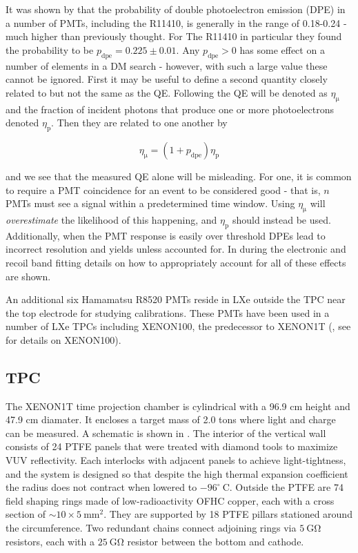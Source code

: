 It was shown by  that the probability of double photoelectron emission (DPE) in a number of PMTs, including the
R11410, is generally in the range of 0.18-0.24 - much higher than previously thought.  For The R11410 in particular they found the
probability to be $p_{\mathrm{dpe}} = 0.225 \pm 0.01$.  Any $p_{\mathrm{dpe}} > 0$ has some effect on a number of elements in a DM
search - however, with such a large value these cannot be ignored.  First it may be useful to define a second quantity closely
related to but not the same as the QE.  Following  the QE will be denoted as $\eta_{\mathrm{\mu}}$ and the fraction of
incident photons that produce one or more photoelectrons denoted $\eta_{\mathrm{p}}$.  Then they are related to one another by

\begin{equation}
\eta_{\mathrm{\mu}} = (1 + p_{\mathrm{dpe}}) \eta_{\mathrm{p}}
\label{eq:xenon1t_pmts_dpe}
\end{equation}

\noindent and we see that the measured QE alone will be misleading.  For one, it is common to require a PMT coincidence for an event to
be considered good - that is, $n$ PMTs must see a signal within a predetermined time window.  Using $\eta_{\mathrm{\mu}}$ will
\textit{overestimate} the likelihood of this happening, and $\eta_{\mathrm{p}}$ should instead be used.  Additionally, when the PMT
response is easily over threshold DPEs lead to incorrect resolution and yields unless accounted for.  In
 during the electronic and recoil band fitting details on how to
appropriately account for all of these effects are shown.

An additional six Hamamatsu R8520 PMTs reside in LXe outside the TPC near the top electrode for studying calibrations.  These PMTs have
been used in a number of LXe TPCs including XENON100, the predecessor to XENON1T (, see  for
details on XENON100).




\subsection{TPC}
\label{subsec:xenon1t_tpc}
The XENON1T time projection chamber is cylindrical with a 96.9 cm height and 47.9 cm diamater.  It encloses a target mass of 2.0 tons where
light and charge can be measured.  A schematic is shown in .  The interior of the vertical wall consists of 24
PTFE panels that were treated with diamond tools to
maximize VUV reflectivity.  Each interlocks with adjacent panels to achieve light-tightness, and the system is designed so that despite
the high thermal expansion coefficient the radius does not contract when lowered to $-96^{\circ}\ \mathrm{C}$.  Outside the PTFE are 74
field shaping rings made of low-radioactivity OFHC copper, each with a cross section of ${\sim} 10 \times 5\ \mathrm{mm^{2}}$.  They are
supported by 18 PTFE pillars stationed around the circumference.  Two redundant
chains connect adjoining rings via $5\ \mathrm{G \Omega}$ resistors, each with a $25\ \mathrm{G \Omega}$ resistor between the bottom and
cathode.

